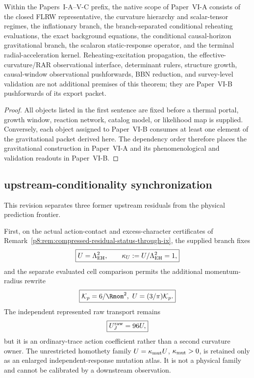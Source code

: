 \documentclass[12pt,a4paper]{article}
\begin{document}
\begin{theorem}
\label{p8:thm:first-gravitational-closure-boundary}
Within the Papers~I-A--V-C prefix, the native scope of Paper~VI-A consists of the closed FLRW representative, the curvature hierarchy and scalar-tensor regimes, the inflationary branch, the branch-separated conditional reheating evaluations, the exact background equations, the conditional causal-horizon gravitational branch, the scalaron static-response operator, and the terminal radial-acceleration kernel.  Reheating-excitation propagation, the effective-curvature/RAR observational interface, determinant rulers, structure growth, causal-window observational pushforwards, BBN reduction, and survey-level validation are not additional premises of this theorem; they are Paper~VI-B pushforwards of its export packet.
\end{theorem}

\begin{proof}
All objects listed in the first sentence are fixed before a thermal portal, growth window, reaction network, catalog model, or likelihood map is supplied.  Conversely, each object assigned to Paper~VI-B consumes at least one element of the gravitational packet derived here.  The dependency order therefore places the gravitational construction in Paper~VI-A and its phenomenological and validation readouts in Paper~VI-B.
\end{proof}

\subsection{upstream-conditionality synchronization}
\label{p8:sec:post-v125-conditionality}

This revision separates three former upstream residuals from the physical
prediction frontier.

First, on the actual action-contact and excess-character certificates of
Remark~\ref{p8:rem:compressed-residual-status-through-ix}, the supplied branch fixes
\[
 \boxed{U=\Lambda_{\rm EH}^{2},\qquad \kappa_U:=U/\Lambda_{\rm EH}^{2}=1,}
\]
and the separate evaluated cell comparison permits the additional momentum-radius rewrite
\[
 \boxed{\mathcal K_p=6/\Rmom^2,\ U=(3/\pi)\mathcal K_p.}
\]
The independent represented raw transport remains
\[
 \boxed{U_J^{\rm raw}=96U,}
\]
but it is an ordinary-trace action coefficient rather than a second curvature owner.  The unrestricted homothety family \(U=\kappa_{\rm mut}U\), \(\kappa_{\rm mut}>0\), is retained only as an enlarged independent-response mutation atlas.  It is not a physical family and cannot be calibrated by a downstream observation.
\end{document}
